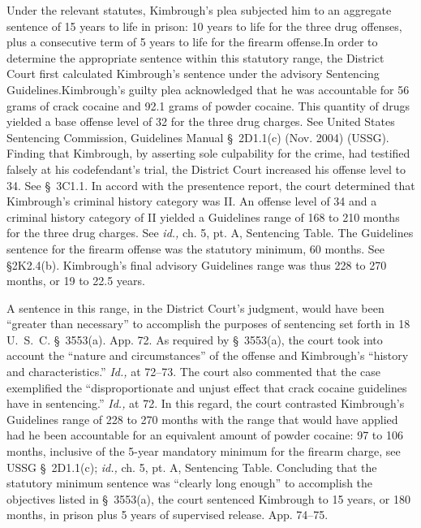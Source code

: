   Under the relevant statutes, Kimbrough's plea subjected him to
an aggregate sentence of 15 years to life in prison: 10 years to
life for the three drug offenses, plus a consecutive \newpage  term of
5 years to life for the firearm offense.In order to determine the
appropriate sentence within this statutory range, the District Court
first calculated Kimbrough's sentence under the advisory Sentencing
Guidelines.\footnotemark[2] Kimbrough's guilty plea acknowledged that he was
accountable for 56 grams of crack cocaine and 92.1 grams of powder
cocaine. This quantity of drugs yielded a base offense level of 32 for
the three drug charges. See United States Sentencing Commission,
Guidelines Manual \S~2D1.1(c) (Nov. 2004) (USSG). Finding that
Kimbrough, by asserting sole culpability for the crime, had testified
falsely at his codefendant's trial, the District Court increased his
offense level to 34. See \S~3C1.1. In accord with the presentence
report, the court determined that Kimbrough's criminal history
category was II. An offense level of 34 and a criminal history category
of II yielded a Guidelines range of 168 to 210 months for the three drug
charges. See \emph{id.,} ch. 5, pt. A, Sentencing Table. The Guidelines
sentence for the firearm offense was the statutory minimum, 60 months.
See \S2K2.4(b). Kimbrough's final advisory Guidelines range was
thus 228 to 270 months, or 19 to 22.5 years.

  A sentence in this range, in the District Court's judgment, would
have been ``greater than necessary'' to accomplish the \newpage  purposes
of sentencing set forth in 18 U.~S.~C. \S~3553(a). App. 72. As
required by \S~3553(a), the court took into account the ``nature
and circumstances'' of the offense and Kimbrough's ``history and
characteristics.'' \emph{Id.,} at 72--73. The court also commented
that the case exemplified the ``disproportionate and unjust effect
that crack cocaine guidelines have in sentencing.'' \emph{Id.,} at
72. In this regard, the court contrasted Kimbrough's Guidelines
range of 228 to 270 months with the range that would have applied had
he been accountable for an equivalent amount of powder cocaine: 97 to
106 months, inclusive of the 5-year mandatory minimum for the firearm
charge, see USSG \S~2D1.1(c); \emph{id.,} ch. 5, pt. A, Sentencing
Table. Concluding that the statutory minimum sentence was ``clearly
long enough'' to accomplish the objectives listed in \S~3553(a), the
court sentenced Kimbrough to 15 years, or 180 months, in prison plus 5
years of supervised release. App. 74--75.\footnotemark[3]



